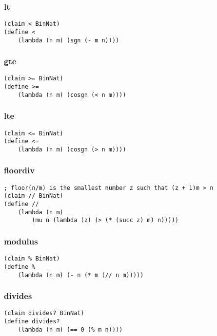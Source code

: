 \subsubsection{lt} \label{code:lt}
\begin{verbatim}
(claim < BinNat)
(define <
    (lambda (n m) (sgn (- m n))))
\end{verbatim}

\subsubsection{gte} \label{code:gte}
\begin{verbatim}
(claim >= BinNat)
(define >=
    (lambda (n m) (cosgn (< n m))))
\end{verbatim}

\subsubsection{lte} \label{code:lte}
\begin{verbatim}
(claim <= BinNat)
(define <=
    (lambda (n m) (cosgn (> n m))))
\end{verbatim}

\subsubsection{floordiv} \label{code:floordiv}
\begin{verbatim}
; floor(n/m) is the smallest number z such that (z + 1)m > n
(claim // BinNat)
(define //
    (lambda (n m)
        (mu n (lambda (z) (> (* (succ z) m) n)))))
\end{verbatim}

\subsubsection{modulus} \label{code:modulus}
\begin{verbatim}
(claim % BinNat)
(define %
    (lambda (n m) (- n (* m (// n m)))))
\end{verbatim}

\subsubsection{divides} \label{code:divides}
\begin{verbatim}
(claim divides? BinNat)
(define divides?
    (lambda (n m) (== 0 (% m n))))
\end{verbatim}

